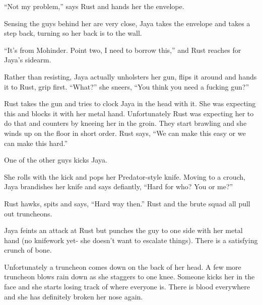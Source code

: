 ``Not my problem,'' says Rust and hands her the envelope.

Sensing the guys behind her are very close, Jaya takes the envelope and takes a step back, turning so her back is to the wall.

``It's from Mohinder.  Point two, I need to borrow this,'' and Rust reaches for Jaya's sidearm.

Rather than resisting, Jaya actually unholsters her gun, flips it around and hands it to Rust, grip first.  ``What?'' she sneers, ``You think you need a fucking gun?''

Rust takes the gun and tries to clock Jaya in the head with it.  She was expecting this and blocks it with her metal hand.  Unfortunately Rust was expecting her to do that and counters by kneeing her in the groin.  They start brawling and she winds up on the floor in short order.  Rust says, ``We can make this easy or we can make this hard.''  

One of the other guys kicks Jaya.  

She rolls with the kick and pops her Predator-style knife.  Moving to a crouch, Jaya brandishes her knife and says defiantly, ``Hard for who?  You or me?''

Rust hawks, spits and says, ``Hard way then.''  Rust and the brute squad all pull out truncheons.



Jaya feints an attack at Rust but punches the guy to one side with her metal hand (no knifework yet- she doesn't want to escalate things).  There is a satisfying crunch of bone. 

Unfortunately a truncheon comes down on the back of her head.  A few more truncheon blows rain down as she staggers to one knee. Someone kicks her in the face and she starts losing track of where everyone is.  There is blood everywhere and she has definitely broken her nose again.



